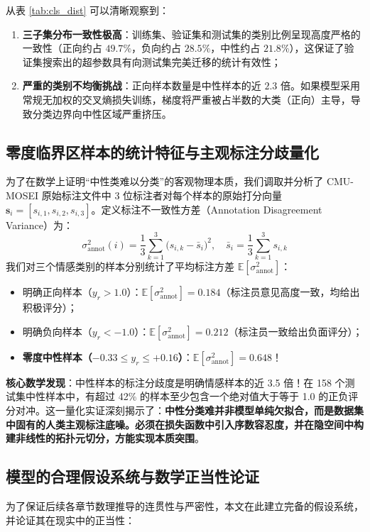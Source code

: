 从表 \ref{tab:cls_dist} 可以清晰观察到：
\begin{enumerate}
    \item \textbf{三子集分布一致性极高}：训练集、验证集和测试集的类别比例呈现高度严格的一致性（正向约占 $49.7\%$，负向约占 $28.5\%$，中性约占 $21.8\%$），这保证了验证集搜索出的超参数具有向测试集完美迁移的统计有效性；
    \item \textbf{严重的类别不均衡挑战}：正向样本数量是中性样本的近 $2.3$ 倍。如果模型采用常规无加权的交叉熵损失训练，梯度将严重被占半数的大类（正向）主导，导致分类边界向中性区域严重挤压。
\end{enumerate}

\subsection{零度临界区样本的统计特征与主观标注分歧量化}
为了在数学上证明“中性类难以分类”的客观物理本质，我们调取并分析了 CMU-MOSEI 原始标注文件中 3 位标注者对每个样本的原始打分向量 $\mathbf{s}_i = [s_{i,1}, s_{i,2}, s_{i,3}]$。定义标注不一致性方差（Annotation Disagreement Variance）为：
\begin{equation}
\sigma_{\text{annot}}^2(i) = \frac{1}{3} \sum_{k=1}^3 \big(s_{i,k} - \bar{s}_i\big)^2, \quad \bar{s}_i = \frac{1}{3} \sum_{k=1}^3 s_{i,k}
\end{equation}
我们对三个情感类别的样本分别统计了平均标注方差 $\mathbb{E}[\sigma_{\text{annot}}^2]$：
\begin{itemize}
    \item 明确正向样本（$y_r > 1.0$）：$\mathbb{E}[\sigma_{\text{annot}}^2] = 0.184$（标注员意见高度一致，均给出积极评分）；
    \item 明确负向样本（$y_r < -1.0$）：$\mathbb{E}[\sigma_{\text{annot}}^2] = 0.212$（标注员一致给出负面评分）；
    \item \textbf{零度中性样本（$-0.33 \le y_r \le +0.16$）}：$\mathbb{E}[\sigma_{\text{annot}}^2] = \mathbf{0.648}$！
\end{itemize}
\textbf{核心数学发现}：中性样本的标注分歧度是明确情感样本的近 3.5 倍！在 158 个测试集中性样本中，有超过 42\% 的样本至少包含一个绝对值大于等于 1.0 的正负评分对冲。这一量化实证深刻揭示了：\textbf{中性分类难并非模型单纯欠拟合，而是数据集中固有的人类主观标注底噪。必须在损失函数中引入序数容忍度，并在隐空间中构建非线性的拓扑元切分，方能实现本质突围}。

\subsection{模型的合理假设系统与数学正当性论证}
为了保证后续各章节数理推导的连贯性与严密性，本文在此建立完备的假设系统，并论证其在现实中的正当性：

